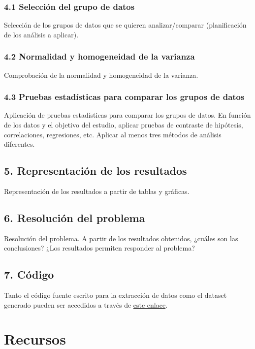 \documentclass[12pt]{article}
\begin{document}
\hypertarget{seleccion}{%
\subsubsection{4.1 Selección del grupo de datos}\label{seleccion}}
Selección de los grupos de datos que se quieren analizar/comparar (planificación de los análisis a aplicar). 
\hypertarget{normalidad}{%
\subsubsection{4.2  Normalidad y homogeneidad de la varianza}\label{normalidad}}
Comprobación de la normalidad y homogeneidad de la varianza. 

\hypertarget{estadistica}{%
\subsubsection{4.3  Pruebas estadísticas para comparar los grupos de datos}\label{estadistica}}
Aplicación de pruebas estadísticas para comparar los grupos de datos. En función de los datos y el objetivo del estudio, aplicar pruebas de contraste de hipótesis, correlaciones, regresiones, etc. Aplicar al menos tres métodos de análisis diferentes. 

\hypertarget{representacion}{%
\subsection{5. Representación de los resultados}\label{representacion}}
Representación de los resultados a partir de tablas y gráficas. 
\hypertarget{resolucion}{%
\subsection{6. Resolución del problema}\label{resolucion}}
Resolución del problema. A partir de los resultados obtenidos, ¿cuáles son las conclusiones? ¿Los resultados permiten responder al problema? 
\hypertarget{codigo}{%
\subsection{7. Código}\label{codigo}}

Tanto el código fuente escrito para la extracción de datos como el
dataset generado pueden ser accedidos a través de
\href{https://github.com/raquel8893/Tipologia-PRA2}{este enlace}.

\hypertarget{recursos}{%
\section{Recursos}\label{recursos}}
\end{document}
